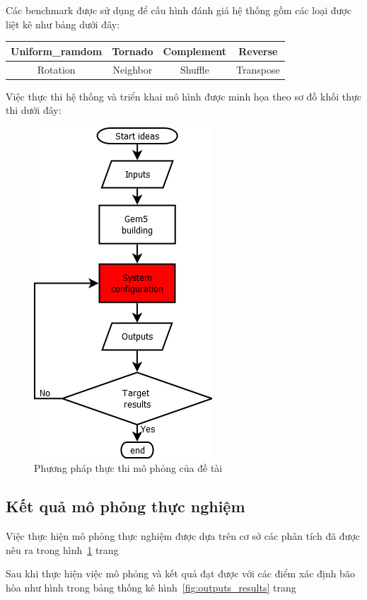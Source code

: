 \documentclass{article}
\begin{document}
Các benchmark được sử dụng để cấu hình đánh giá hệ thống gồm các loại được liệt kê như bảng dưới đây:

\begin{center}
	\begin{tabular} {|c|c|c|c|}
		\hline
		Uniform\_ramdom&Tornado&Complement&Reverse \\
		\hline
		Rotation&Neighbor&Shuffle&Transpose \\
		\hline
	\end{tabular}
\end{center}

Việc thực thi hệ thống và triển khai mô hình được minh họa theo sơ đồ khối thực thi dưới đây:

\begin{figure}[h!]
	\centering
	\includegraphics[width=0.3\linewidth]{methodofGarnetGem5Implementation}
	\caption{Phương pháp thực thi mô phỏng của đề tài}
	\label{fig:methodofGarnetGem5Implementation}
\end{figure}

\subsection{Kết quả mô phỏng thực nghiệm} \label{results}
Việc thực hiện mô phỏng thực nghiệm được dựa trên cơ sở các phân tích đã được nêu ra trong hình~\ref*{fig:methodofGarnetGem5Implementation} trang ~\pageref{fig:methodofGarnetGem5Implementation}

Sau khi thực hiện việc mô phỏng và kết quả đạt được với các điểm xác định bão hòa như hình trong bảng thống kê hình~\ref{fig:outputs_results} trang ~\pageref{fig:outputs_results}
\end{document}
